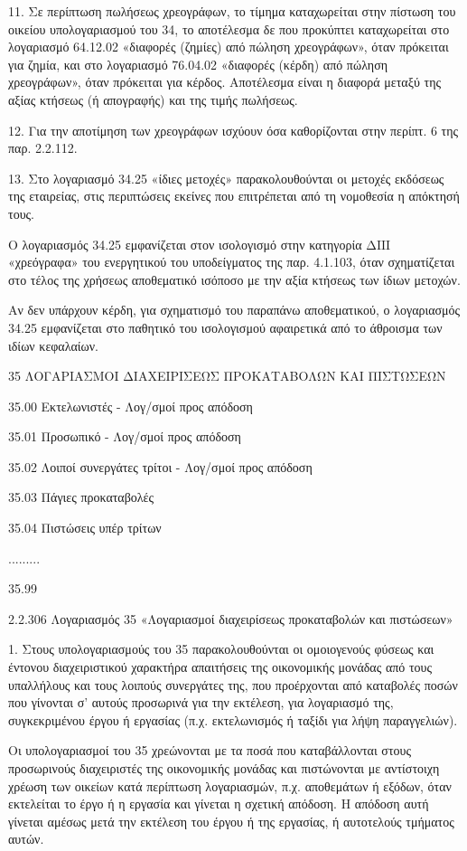 \documentclass[A4,10pt,greek]{book}
\begin{document}
11. Σε περίπτωση πωλήσεως χρεογράφων, το τίμημα καταχωρείται στην πίστωση του οικείου υπολογαριασμού του 34, το αποτέλεσμα δε που προκύπτει καταχωρείται στο λογαριασμό 64.12.02 «διαφορές (ζημίες) από πώληση χρεογράφων», όταν πρόκειται για ζημία, και στο λογαριασμό 76.04.02 «διαφορές (κέρδη) από πώληση χρεογράφων», όταν πρόκειται για κέρδος. Αποτέλεσμα είναι η διαφορά μεταξύ της αξίας κτήσεως (ή απογραφής) και της τιμής πωλήσεως.

12. Για την αποτίμηση των χρεογράφων ισχύουν όσα καθορίζονται στην περίπτ. 6 της παρ. 2.2.112.

13. Στο λογαριασμό 34.25 «ίδιες μετοχές» παρακολουθούνται οι μετοχές εκδόσεως της εταιρείας, στις περιπτώσεις εκείνες που επιτρέπεται από τη νομοθεσία η απόκτησή τους.

Ο λογαριασμός 34.25 εμφανίζεται στον ισολογισμό στην κατηγορία ΔΙΙΙ «χρεόγραφα» του ενεργητικού του υποδείγματος της παρ. 4.1.103, όταν σχηματίζεται στο τέλος της χρήσεως αποθεματικό ισόποσο με την αξία κτήσεως των ίδιων μετοχών.

Αν δεν υπάρχουν κέρδη, για σχηματισμό του παραπάνω αποθεματικού, ο λογαριασμός 34.25 εμφανίζεται στο παθητικό του ισολογισμού αφαιρετικά από το άθροισμα των ιδίων κεφαλαίων.

 35   ΛΟΓΑΡΙΑΣΜΟΙ ΔΙΑΧΕΙΡΙΣΕΩΣ ΠΡΟΚΑΤΑΒΟΛΩΝ ΚΑΙ ΠΙΣΤΩΣΕΩΝ

        35.00   Εκτελωνιστές - Λογ/σμοί προς απόδοση

        35.01   Προσωπικό - Λογ/σμοί προς απόδοση

        35.02   Λοιποί συνεργάτες τρίτοι - Λογ/σμοί προς απόδοση

        35.03   Πάγιες προκαταβολές

        35.04   Πιστώσεις υπέρ τρίτων

        .........

        35.99

2.2.306 Λογαριασμός 35 «Λογαριασμοί διαχειρίσεως προκαταβολών και πιστώσεων»

1. Στους υπολογαριασμούς του 35 παρακολουθούνται οι ομοιογενούς φύσεως και έντονου διαχειριστικού χαρακτήρα απαιτήσεις της οικονομικής μονάδας από τους υπαλλήλους και τους λοιπούς συνεργάτες της, που προέρχονται από καταβολές ποσών που γίνονται σ' αυτούς προσωρινά για την εκτέλεση, για λογαριασμό της, συγκεκριμένου έργου ή εργασίας (π.χ. εκτελωνισμός ή ταξίδι για λήψη παραγγελιών).

Οι υπολογαριασμοί του 35 χρεώνονται με τα ποσά που καταβάλλονται στους προσωρινούς διαχειριστές της οικονομικής μονάδας και πιστώνονται με αντίστοιχη χρέωση των οικείων κατά περίπτωση λογαριασμών, π.χ. αποθεμάτων ή εξόδων, όταν εκτελείται το έργο ή η εργασία και γίνεται η σχετική απόδοση. Η απόδοση αυτή γίνεται αμέσως μετά την εκτέλεση του έργου ή της εργασίας, ή αυτοτελούς τμήματος αυτών.
\end{document}

